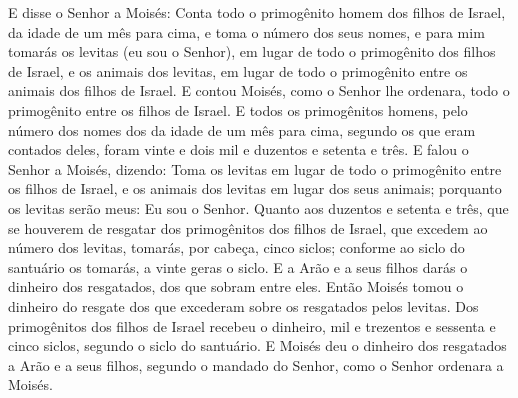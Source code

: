 E disse o Senhor a Moisés: Conta todo o primogênito homem dos
filhos de Israel, da idade de um mês para cima, e toma o número dos
seus nomes, e para mim tomarás os levitas (eu sou o Senhor),
em lugar de todo o primogênito dos filhos de Israel, e os animais
dos levitas, em lugar de todo o primogênito entre os animais dos
filhos de Israel. E contou Moisés, como o Senhor lhe
ordenara, todo o primogênito entre os filhos de Israel. E
todos os primogênitos homens, pelo número dos nomes dos da idade de
um mês para cima, segundo os que eram contados deles, foram vinte e
dois mil e duzentos e setenta e três. E falou o Senhor a
Moisés, dizendo: Toma os levitas em lugar de todo o
primogênito entre os filhos de Israel, e os animais dos levitas em
lugar dos seus animais; porquanto os levitas serão meus: Eu sou o
Senhor. Quanto aos duzentos e setenta e três, que se houverem
de resgatar dos primogênitos dos filhos de Israel, que excedem ao
número dos levitas, tomarás, por cabeça, cinco siclos;
conforme ao siclo do santuário os tomarás, a vinte geras o siclo.
E a Arão e a seus filhos darás o dinheiro dos resgatados, dos
que sobram entre eles. Então Moisés tomou o dinheiro do
resgate dos que excederam sobre os resgatados pelos levitas.
Dos primogênitos dos filhos de Israel recebeu o dinheiro, mil
e trezentos e sessenta e cinco siclos, segundo o siclo do santuário.
E Moisés deu o dinheiro dos resgatados a Arão e a seus
filhos, segundo o mandado do Senhor, como o Senhor ordenara a
Moisés.

\medskip

